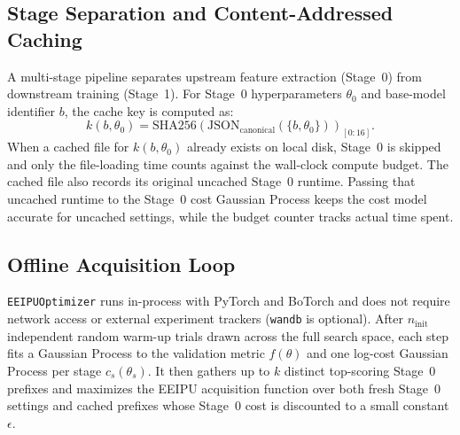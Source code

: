 \documentclass[11pt,letterpaper]{article}
\begin{document}
\subsection{Stage Separation and Content-Addressed Caching}
A multi-stage pipeline separates upstream feature extraction (Stage~0) from downstream training (Stage~1). For Stage~0 hyperparameters $\theta_0$ and base-model identifier $b$, the cache key is computed as:
\[
  k(b, \theta_0) = \mathrm{SHA256}\!\left(\mathrm{JSON}_{\text{canonical}}(\{b, \theta_0\})\right)_{[0:16]}.
\]
When a cached file for $k(b, \theta_0)$ already exists on local disk, Stage~0 is skipped and only the file-loading time counts against the wall-clock compute budget. The cached file also records its original uncached Stage~0 runtime. Passing that uncached runtime to the Stage~0 cost Gaussian Process keeps the cost model accurate for uncached settings, while the budget counter tracks actual time spent.

\subsection{Offline Acquisition Loop}
\texttt{EEIPUOptimizer} runs in-process with PyTorch and BoTorch and does not require network access or external experiment trackers (\texttt{wandb} is optional). After $n_{\text{init}}$ independent random warm-up trials drawn across the full search space, each step fits a Gaussian Process to the validation metric $f(\theta)$ and one log-cost Gaussian Process per stage $c_s(\theta_s)$. It then gathers up to $k$ distinct top-scoring Stage~0 prefixes and maximizes the EEIPU acquisition function over both fresh Stage~0 settings and cached prefixes whose Stage~0 cost is discounted to a small constant $\epsilon$.
\end{document}

